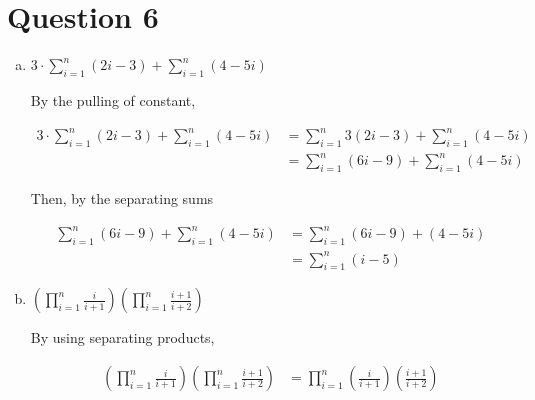 \documentclass[12pt]{article}
\begin{document}
\section*{Question 6}
\begin{enumerate}[a.]
    \item

    $3 \cdot \sum\limits_{i=1}^n (2i - 3) + \sum\limits_{i=1}^n (4 - 5i)$

    \bigskip

    By the pulling of constant,

    \begin{align*}
        3 \cdot \sum\limits_{i=1}^n (2i - 3) + \sum\limits_{i=1}^n (4 - 5i) &= \sum\limits_{i=1}^n 3(2i-3) + \sum\limits_{i=1}^n (4 - 5i)\\
        &= \sum\limits_{i=1}^n (6i-9) + \sum\limits_{i=1}^n (4 - 5i)
    \end{align*}

    \bigskip

    Then, by the separating sums

    \begin{align*}
        \sum\limits_{i=1}^n (6i-9) + \sum\limits_{i=1}^n (4 - 5i) &= \sum\limits_{i=1}^n (6i-9) + (4 - 5i)\\
        &= \sum\limits_{i=1}^n (i-5)
    \end{align*}

    \item

    $\left( \prod\limits_{i=1}^n \frac{i}{i+1} \right) \left( \prod\limits_{i=1}^n \frac{i+1}{i+2} \right)$

    \bigskip

    By using separating products,

    \begin{align*}
        \left( \prod\limits_{i=1}^n \frac{i}{i+1} \right) \left( \prod\limits_{i=1}^n \frac{i+1}{i+2} \right) &= \prod\limits_{i=1}^n \left( \frac{i}{i+1} \right) \left( \frac{i+1}{i+2} \right)
    \end{align*}
\end{enumerate}
\end{document}
